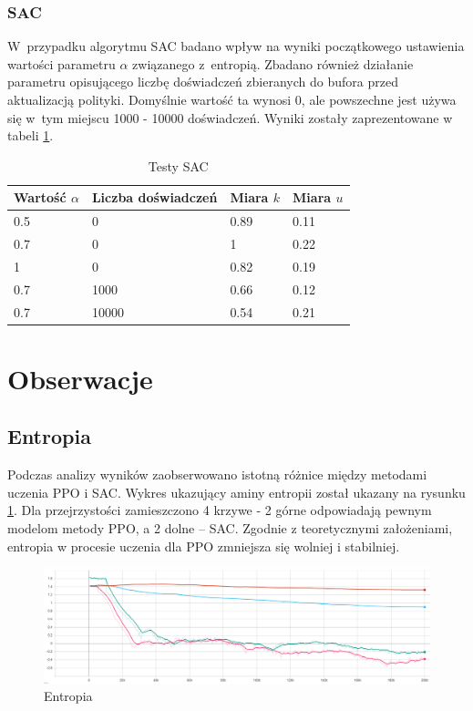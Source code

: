 \documentclass[a4paper,12pt]{article}
\let\oldsection\section
\renewcommand\section{\clearpage\oldsection}
\begin{document}
\subsubsection{SAC}
W~przypadku algorytmu SAC badano wpływ na wyniki początkowego ustawienia wartości parametru $\alpha$ związanego z~entropią. Zbadano również działanie parametru opisującego liczbę doświadczeń zbieranych do bufora przed aktualizacją polityki. Domyślnie wartość ta wynosi 0, ale powszechne jest używa się w~tym miejscu 1000 - 10000 doświadczeń. Wyniki zostały zaprezentowane w tabeli \ref{tab:sac}.

\begin{table}[H]
	\centering
	\smallskip
	\begin{tabular}{|l|l|l|l|}
		\hline
		Wartość $\alpha$ & Liczba doświadczeń & Miara $k$ & Miara $u$ \\
		\hline
		0.5 & 0 & 0.89 & 0.11 \\		
		0.7 & 0 & 1 & 0.22 \\		
		1 & 0 & 0.82 & 0.19 \\		
		0.7 & 1000 & 0.66 & 0.12 \\	
		0.7 & 10000 & 0.54 & 0.21 \\\hline
	\end{tabular}
	\caption{Testy SAC}
	\label{tab:sac}
\end{table}


\section{Obserwacje}

\subsection{Entropia}
Podczas analizy wyników zaobserwowano istotną różnice między metodami uczenia PPO i SAC. Wykres ukazujący aminy entropii został ukazany na rysunku \ref{pic:entropy}. Dla przejrzystości zamieszczono 4 krzywe - 2 górne odpowiadają pewnym modelom metody PPO, a 2 dolne -- SAC. Zgodnie z teoretycznymi założeniami, entropia w procesie uczenia dla PPO zmniejsza się wolniej i stabilniej. 
\begin{figure}[H]
	\centering
	\includegraphics[width=\textwidth]{entropy}
	\caption{Entropia}
	\label{pic:entropy}
\end{figure}
\end{document}
